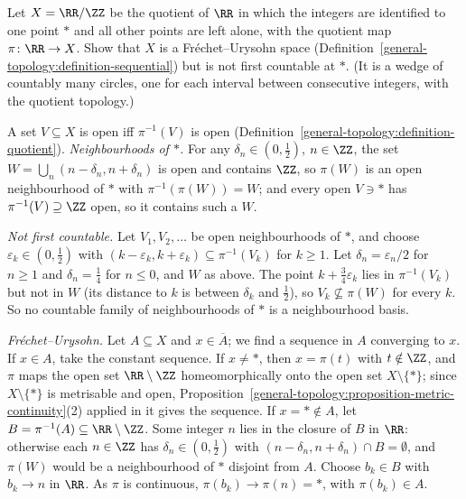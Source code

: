 \begin{exercise}\label{general-topology:exercise-bouquet-frechet-urysohn}
Let $X = \RR/\ZZ$ be the quotient of $\RR$ in which the integers are identified to one point $\ast$ and all other points are left alone, with the quotient map $\pi \colon \RR \to X$. Show that $X$ is a Fr\'echet--Urysohn space
(Definition~\ref{general-topology:definition-sequential}) but is not first countable at $\ast$. (It is a wedge of countably many circles, one for each interval between consecutive integers, with the quotient topology.)
\end{exercise}

\begin{solution}
A set $V \subseteq X$ is open iff $\pi^{-1}(V)$ is open (Definition~\ref{general-topology:definition-quotient}). \emph{Neighbourhoods of $\ast$.} For any $\delta_n \in (0, \frac12)$, $n \in \ZZ$, the set
$W = \bigcup_n(n - \delta_n, n + \delta_n)$ is open and contains $\ZZ$, so $\pi(W)$ is an open neighbourhood of $\ast$ with $\pi^{-1}(\pi(W)) = W$; and every open $V \ni \ast$ has $\pi^{-1}(V) \supseteq \ZZ$ open, so it
contains such a $W$.

\emph{Not first countable.} Let $V_1, V_2, \ldots$ be open neighbourhoods of $\ast$, and choose $\varepsilon_k \in (0, \frac12)$ with $(k - \varepsilon_k, k + \varepsilon_k) \subseteq \pi^{-1}(V_k)$ for $k \geq 1$. Let $\delta_n = \varepsilon_n/2$ for $n \geq 1$
and $\delta_n = \frac14$ for $n \leq 0$, and $W$ as above. The point $k + \frac34\varepsilon_k$ lies in $\pi^{-1}(V_k)$ but not in $W$ (its distance to $k$ is between $\delta_k$ and $\frac12$), so $V_k \not\subseteq \pi(W)$ for
every $k$. So no countable family of neighbourhoods of $\ast$ is a neighbourhood basis.

\emph{Fr\'echet--Urysohn.} Let $A \subseteq X$ and $x \in \overline{A}$; we find a sequence in $A$ converging to $x$. If $x \in A$, take the constant sequence. If $x \neq \ast$, then $x = \pi(t)$ with $t \notin \ZZ$, and $\pi$ maps
the open set $\RR \setminus \ZZ$ homeomorphically onto the open set $X \setminus \{\ast\}$; since $X \setminus \{\ast\}$ is metrisable and open, Proposition~\ref{general-topology:proposition-metric-continuity}(2) applied in it gives the
sequence. If $x = \ast \notin A$, let $B = \pi^{-1}(A) \subseteq \RR \setminus \ZZ$. Some integer $n$ lies in the closure of $B$ in $\RR$: otherwise each $n \in \ZZ$ has $\delta_n \in (0, \frac12)$ with
$(n - \delta_n, n + \delta_n) \cap B = \emptyset$, and $\pi(W)$ would be a neighbourhood of $\ast$ disjoint from $A$. Choose $b_k \in B$ with $b_k \to n$ in $\RR$. As $\pi$ is continuous, $\pi(b_k) \to \pi(n) = \ast$, with
$\pi(b_k) \in A$.
\end{solution}

